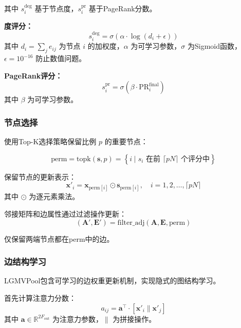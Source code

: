 其中 $s_i^{\text{deg}}$ 基于节点度，$s_i^{\text{pr}}$ 基于PageRank分数。

\textbf{度评分：}
\begin{equation}
s_i^{\text{deg}} = \sigma\left( \alpha \cdot \log(d_i + \epsilon) \right)
\end{equation}
其中 $d_i = \sum_j e_{ij}$ 为节点 $i$ 的加权度，$\alpha$ 为可学习参数，$\sigma$ 为Sigmoid函数，$\epsilon = 10^{-16}$ 防止数值问题。

\textbf{PageRank评分：}
\begin{equation}
s_i^{\text{pr}} = \sigma\left( \beta \cdot \text{PR}_i^{\text{final}} \right)
\end{equation}
其中 $\beta$ 为可学习参数。

\subsubsection{节点选择}

使用Top-K选择策略保留比例 $p$ 的重要节点：

\begin{equation}
\text{perm} = \text{topk}(\mathbf{s}, p) = \left\{ i \mid s_i \text{ 在前 } \lceil pN \rceil \text{ 个评分中} \right\}
\end{equation}

保留节点的更新表示：
\begin{equation}
\mathbf{x}'_i = \mathbf{x}_{\text{perm}[i]} \odot \mathbf{s}_{\text{perm}[i]}, \quad i = 1, 2, \ldots, \lceil pN \rceil
\end{equation}
其中 $\odot$ 为逐元素乘法。

邻接矩阵和边属性通过过滤操作更新：
\begin{equation}
(\mathbf{A}', \mathbf{E}') = \text{filter\_adj}(\mathbf{A}, \mathbf{E}, \text{perm})
\end{equation}

仅保留两端节点都在perm中的边。

\subsubsection{边结构学习}

LGMVPool包含可学习的边权重更新机制，实现隐式的图结构学习。

首先计算注意力分数：
\begin{equation}
a_{ij} = \mathbf{a}^{\top} \cdot \left[ \mathbf{x}'_i \parallel \mathbf{x}'_j \right]
\end{equation}
其中 $\mathbf{a} \in \mathbb{R}^{2F_{\text{out}}}$ 为注意力参数，$\parallel$ 为拼接操作。

